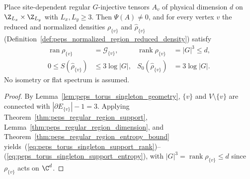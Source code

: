 \begin{lemma}%
    \label{thm:peps_regular_torus_singleton_support}
    \leanok
    Place site-dependent regular $G$-injective tensors $A_v$ of physical
    dimension $d$ on $\Z_{L_x}\times\Z_{L_y}$ with $L_x,L_y\ge 3$. Then
    $\Psi(A)\ne 0$, and for every vertex $v$ the reduced and normalized
    densities $\rho_{\{v\}}$ and $\widehat\rho_{\{v\}}$
    (Definition~\ref{def:peps_normalized_region_reduced_density}) satisfy
    \begin{align}
        \operatorname{ran}\rho_{\{v\}} & = \mathcal G_{\{v\}},
                                       & \operatorname{rank}\rho_{\{v\}} & = |G|^3\leq d,
        \label{eq:peps_torus_singleton_support_rank}                                      \\
        0\leq S(\widehat\rho_{\{v\}})  & \leq 3\log|G|,
                                       & S_0(\widehat\rho_{\{v\}})       & = 3\log|G|.
        \label{eq:peps_torus_singleton_support_entropy}
    \end{align}
    No isometry or flat spectrum is assumed.
\end{lemma}

\begin{proof}\leanok
    By Lemma~\ref{lem:peps_torus_singleton_geometry}, $\{v\}$ and
    $V\setminus\{v\}$ are connected with $|\partial E_{\{v\}}|-1=3$. Applying
    Theorem~\ref{thm:peps_regular_region_support}, Lemma~\ref{thm:peps_regular_region_dimension},
    and Theorem~\ref{thm:peps_regular_region_entropy_bound} yields~(\ref{eq:peps_torus_singleton_support_rank})--(\ref{eq:peps_torus_singleton_support_entropy}),
    with $|G|^3=\operatorname{rank}\rho_{\{v\}}\leq d$ since $\rho_{\{v\}}$ acts on $\C^d$.
\end{proof}

